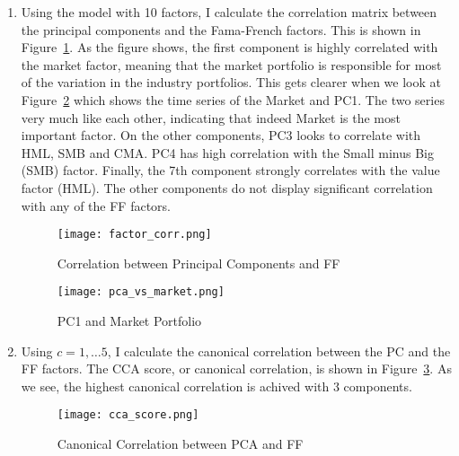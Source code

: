 \begin{solution}
\begin{enumerate}[label = \Alph*)]
    \item Using the model with 10 factors, I calculate the correlation matrix between the principal components and the Fama-French factors. This is shown in Figure~\ref{fig:pca_ff_corr}. As the figure shows, the first component is highly correlated with the market factor, meaning that the market portfolio is responsible for most of the variation in the industry portfolios. This gets clearer when we look at Figure~\ref{fig:pca_vs_market} which shows the time series of the Market and PC1. The two series very much like each other, indicating that indeed Market is the most important factor. On the other components, PC3 looks to correlate with HML, SMB and CMA. PC4 has high correlation with the Small minus Big (SMB) factor. Finally, the 7th component strongly correlates with the value factor (HML). The other components do not display significant correlation with any of the FF factors.
    
    \begin{figure}[!htbp]
        \begin{small}
            \begin{center}
                \texttt{[image: factor\_corr.png]}
            \end{center}
            \caption{Correlation between Principal Components and FF}
            \label{fig:pca_ff_corr}
        \end{small}
    \end{figure}
    
    \begin{figure}[!htbp]
        \begin{small}
            \begin{center}
                \texttt{[image: pca\_vs\_market.png]}
            \end{center}
            \caption{PC1 and Market Portfolio}
            \label{fig:pca_vs_market}
        \end{small}
    \end{figure}
    
    \item Using \(c = 1, \dots 5\), I calculate the canonical correlation between the PC and the FF factors. The CCA score, or canonical correlation, is shown in Figure~\ref{fig:cca_score}. As we see, the highest canonical correlation is achived with 3 components.  
    \begin{figure}[!htbp]
        \begin{small}
            \begin{center}
                \texttt{[image: cca\_score.png]}
            \end{center}
            \caption{Canonical Correlation between PCA and FF}
            \label{fig:cca_score}
        \end{small}
    \end{figure}


\end{enumerate}
\end{solution}
